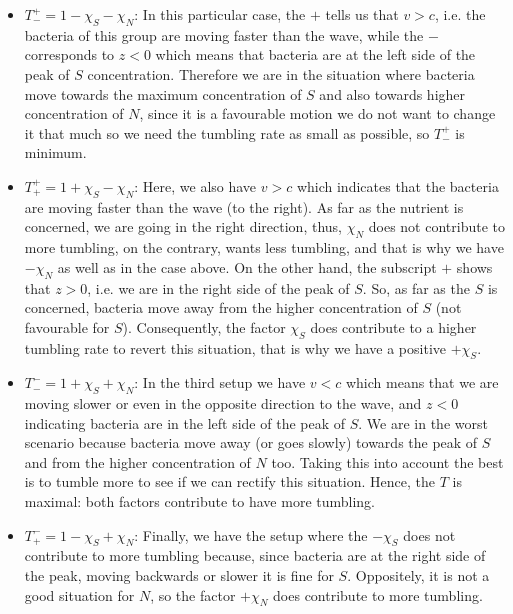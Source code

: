 \documentclass[11pt,twoside]{article}
\theoremstyle{nonumberplain}
\begin{document}
\begin{itemize}
    \item $T^+_- = 1-\chi_S-\chi_N$: In this particular case, the $+$ tells us that $v>c$, i.e. the bacteria of this group are moving faster than the wave, while the $-$ corresponds to $z<0$ which means that bacteria are at the left side of the peak of $S$ concentration. Therefore we are in the situation where bacteria move towards the maximum concentration of $S$ and also towards higher concentration of $N$, since it is a favourable motion we do not want to change it that much so we need the tumbling rate as small as possible, so $T^+_-$ is minimum.
    \item $T^+_+ = 1+\chi_S-\chi_N$: Here, we also have $v>c$ which indicates that the bacteria are moving faster than the wave (to the right). As far as the nutrient is concerned, we are going in the right direction, thus, $\chi_N$ does not contribute to more tumbling, on the contrary, wants less tumbling, and that is why we have $-\chi_N$ as well as in the case above. On the other hand, the subscript $+$ shows that $z>0$, i.e. we are in the right side of the peak of $S$. So, as far as the $S$ is concerned, bacteria move away from the higher concentration of $S$ (not favourable for $S$). Consequently, the factor $\chi_S$ does contribute to a higher tumbling rate to revert this situation, that is why we have a positive $+\chi_S$.

    \item $T^-_- = 1+\chi_S+\chi_N$: In the third setup we have $v<c$ which means that we are moving slower or even in the opposite direction to the wave, and $z<0$ indicating bacteria are in the left side of the peak of $S$. We are in the worst scenario because bacteria move away (or goes slowly) towards the peak of $S$ and from the higher concentration of $N$ too. Taking this into account the best is to tumble more to see if we can rectify this situation. Hence, the $T$ is maximal: both factors contribute to have more tumbling.

    \item $T^-_+ = 1-\chi_S+\chi_N$: Finally, we have the setup where the $-\chi_S$ does not contribute to more tumbling because, since bacteria are at the right side of the peak, moving backwards or slower it is fine for $S$. Oppositely, it is not a good situation for $N$, so the factor $+\chi_N$ does contribute to more tumbling.
\end{itemize}
\end{document}
